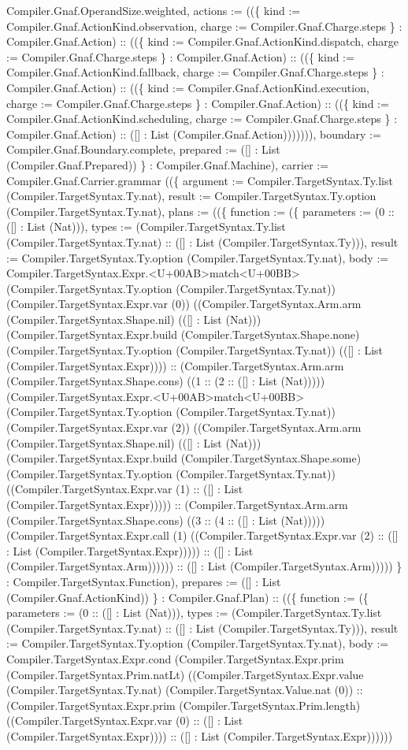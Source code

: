 \documentclass[11pt]{article}
\begin{document}
Compiler.Gnaf.OperandSize.weighted, actions := ((\{ kind := Compiler.Gnaf.ActionKind.observation, charge := Compiler.Gnaf.Charge.steps \} : Compiler.Gnaf.Action) :: ((\{ kind := Compiler.Gnaf.ActionKind.dispatch, charge := Compiler.Gnaf.Charge.steps \} : Compiler.Gnaf.Action) :: ((\{ kind := Compiler.Gnaf.ActionKind.fallback, charge := Compiler.Gnaf.Charge.steps \} : Compiler.Gnaf.Action) :: ((\{ kind := Compiler.Gnaf.ActionKind.execution, charge := Compiler.Gnaf.Charge.steps \} : Compiler.Gnaf.Action) :: ((\{ kind := Compiler.Gnaf.ActionKind.scheduling, charge := Compiler.Gnaf.Charge.steps \} : Compiler.Gnaf.Action) :: ([] : List (Compiler.Gnaf.Action))))))), boundary := Compiler.Gnaf.Boundary.complete, prepared := ([] : List (Compiler.Gnaf.Prepared)) \} : Compiler.Gnaf.Machine), carrier := Compiler.Gnaf.Carrier.grammar ((\{ argument := Compiler.TargetSyntax.Ty.list (Compiler.TargetSyntax.Ty.nat), result := Compiler.TargetSyntax.Ty.option (Compiler.TargetSyntax.Ty.nat), plans := ((\{ function := (\{ parameters := (0 :: ([] : List (Nat))), types := (Compiler.TargetSyntax.Ty.list (Compiler.TargetSyntax.Ty.nat) :: ([] : List (Compiler.TargetSyntax.Ty))), result := Compiler.TargetSyntax.Ty.option (Compiler.TargetSyntax.Ty.nat), body := Compiler.TargetSyntax.Expr.<U+00AB>match<U+00BB> (Compiler.TargetSyntax.Ty.option (Compiler.TargetSyntax.Ty.nat)) (Compiler.TargetSyntax.Expr.var (0)) ((Compiler.TargetSyntax.Arm.arm (Compiler.TargetSyntax.Shape.nil) (([] : List (Nat))) (Compiler.TargetSyntax.Expr.build (Compiler.TargetSyntax.Shape.none) (Compiler.TargetSyntax.Ty.option (Compiler.TargetSyntax.Ty.nat)) (([] : List (Compiler.TargetSyntax.Expr)))) :: (Compiler.TargetSyntax.Arm.arm (Compiler.TargetSyntax.Shape.cons) ((1 :: (2 :: ([] : List (Nat))))) (Compiler.TargetSyntax.Expr.<U+00AB>match<U+00BB> (Compiler.TargetSyntax.Ty.option (Compiler.TargetSyntax.Ty.nat)) (Compiler.TargetSyntax.Expr.var (2)) ((Compiler.TargetSyntax.Arm.arm (Compiler.TargetSyntax.Shape.nil) (([] : List (Nat))) (Compiler.TargetSyntax.Expr.build (Compiler.TargetSyntax.Shape.some) (Compiler.TargetSyntax.Ty.option (Compiler.TargetSyntax.Ty.nat)) ((Compiler.TargetSyntax.Expr.var (1) :: ([] : List (Compiler.TargetSyntax.Expr))))) :: (Compiler.TargetSyntax.Arm.arm (Compiler.TargetSyntax.Shape.cons) ((3 :: (4 :: ([] : List (Nat))))) (Compiler.TargetSyntax.Expr.call (1) ((Compiler.TargetSyntax.Expr.var (2) :: ([] : List (Compiler.TargetSyntax.Expr))))) :: ([] : List (Compiler.TargetSyntax.Arm)))))) :: ([] : List (Compiler.TargetSyntax.Arm))))) \} : Compiler.TargetSyntax.Function), prepares := ([] : List (Compiler.Gnaf.ActionKind)) \} : Compiler.Gnaf.Plan) :: ((\{ function := (\{ parameters := (0 :: ([] : List (Nat))), types := (Compiler.TargetSyntax.Ty.list (Compiler.TargetSyntax.Ty.nat) :: ([] : List (Compiler.TargetSyntax.Ty))), result := Compiler.TargetSyntax.Ty.option (Compiler.TargetSyntax.Ty.nat), body := Compiler.TargetSyntax.Expr.cond (Compiler.TargetSyntax.Expr.prim (Compiler.TargetSyntax.Prim.natLt) ((Compiler.TargetSyntax.Expr.value (Compiler.TargetSyntax.Ty.nat) (Compiler.TargetSyntax.Value.nat (0)) :: (Compiler.TargetSyntax.Expr.prim (Compiler.TargetSyntax.Prim.length) ((Compiler.TargetSyntax.Expr.var (0) :: ([] : List (Compiler.TargetSyntax.Expr)))) :: ([] : List (Compiler.TargetSyntax.Expr)))))) 
\end{document}
